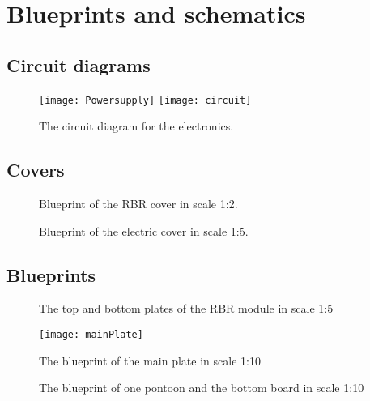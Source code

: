 \clearpage
\section{Blueprints and schematics}\label{sec:appendix-b}
\subsection{Circuit diagrams}
\begin{figure}[H]
  \centering
  \texttt{[image: Powersupply]}
  \texttt{[image: circuit]}
  \caption{The circuit diagram for the electronics.}
  \label{fig:appendix-circuit-diagrams}
\end{figure}

\clearpage
\subsection{Covers}
\begin{figure}[H]
  \centering
  \caption{Blueprint of the RBR cover in scale 1:2.}
  \label{fig:appendix-blueprint-rbr-cover}
\end{figure}

\begin{figure}[H]
  \centering
  \caption{Blueprint of the electric cover in scale 1:5.}
  \label{fig:appendix-blueprint-electronic-cover}
\end{figure}

\clearpage
\subsection{Blueprints}
\begin{figure}[H]
  \centering
  \caption{The top and bottom plates of the RBR module in scale 1:5}
  \label{fig:appendix-blueprint-rbr-module}
\end{figure}

\begin{figure}[H]
    \centering
    \texttt{[image: mainPlate]}
    \caption{The blueprint of the main plate in scale 1:10}
    \label{fig:appendix-blueprint-main-plate}
\end{figure}

\begin{figure}[H]
    \centering
    \caption{The blueprint of one pontoon and the bottom board in scale 1:10}
    \label{fig:appendix-blueprint-ponton}
\end{figure}

